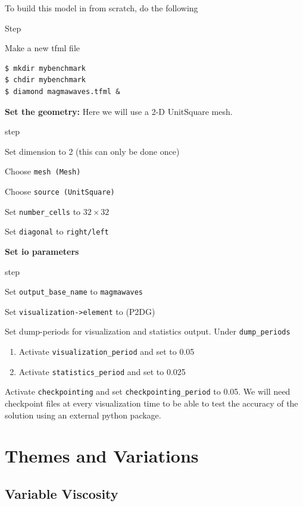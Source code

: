 To build this model in \TF{} from scratch, do the following
\begin{steps}{Step}
  \item Make a new tfml file
  \begin{lstlisting}[style=Bash]
$ mkdir mybenchmark
$ chdir mybenchmark
$ diamond magmawaves.tfml &
  \end{lstlisting}%
\item \textbf{Set the geometry:} Here we will use a 2-D UnitSquare mesh.
  \begin{steps}{step}
  \item Set dimension to 2 (this can only be done once)
  \item Choose \texttt{mesh (Mesh)} 
  \item Choose \texttt{source (UnitSquare)}
  \item Set \texttt{number\_cells} to $32\times32$
  \item Set \texttt{diagonal} to \texttt{right/left}
  \end{steps}
\item \textbf{Set io parameters}
  \begin{steps}{step}
  \item Set \texttt{output\_base\_name} to \texttt{magmawaves}
  \item Set \texttt{visualization->element} to (P2DG)
  \item Set dump-periods for visualization and statistics
    output.  Under \texttt{dump\_periods} 
    \begin{enumerate}
    \item Activate \texttt{visualization\_period} and set to
      0.05
    \item Activate \texttt{statistics\_period} and set to
      0.025
  \end{enumerate}
\item Activate \texttt{checkpointing} and set
  \texttt{checkpointing\_period} to 0.05.  We will need checkpoint
  files at every visualization time to be able to test the accuracy of
  the solution using an external python package.

  \end{steps}


\end{steps}

\section{Themes and Variations}
\label{sec:themes-variations}


\subsection{Variable Viscosity}
\label{sec:variable-viscosity}



